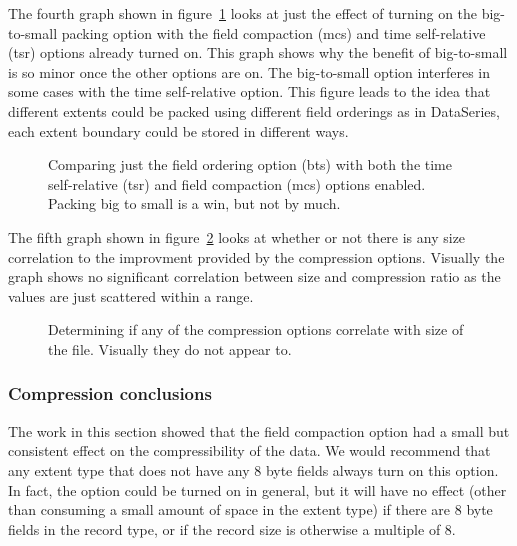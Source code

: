 The fourth graph shown in figure~\ref{fig:wc1998:ds-opts-3} looks at
just the effect of turning on the big-to-small packing option with the
field compaction (mcs) and time self-relative (tsr) options already
turned on.  This graph shows why the benefit of big-to-small is so
minor once the other options are on.  The big-to-small option
interferes in some cases with the time self-relative option.  This
figure leads to the idea that different extents could be packed using
different field orderings as in DataSeries, each extent boundary could
be stored in different ways.

\begin{figure}
\caption{Comparing just the field ordering option (bts) with both the
time self-relative (tsr) and field compaction (mcs) options enabled.
Packing big to small is a win, but not by much.}
\label{fig:wc1998:ds-opts-3}
\end{figure}

The fifth graph shown in figure~\ref{fig:wc1998:ds-size-cmp} looks at
whether or not there is any size correlation to the improvment
provided by the compression options.  Visually the graph shows no
significant correlation between size and compression ratio as the
values are just scattered within a range.

\begin{figure}
\caption{Determining if any of the compression options correlate with
size of the file.  Visually they do not appear to.}
\label{fig:wc1998:ds-size-cmp}
\end{figure}

\subsubsection{Compression conclusions}

The work in this section showed that the field compaction option had a
small but consistent effect on the compressibility of the data.  We
would recommend that any extent type that does not have any 8 byte
fields always turn on this option.  In fact, the option could be
turned on in general, but it will have no effect (other than consuming
a small amount of space in the extent type) if there are 8 byte fields
in the record type, or if the record size is otherwise a multiple of
8.

